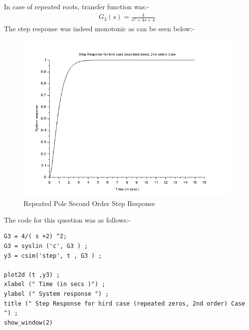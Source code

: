 \documentclass[12pt]{article}
\begin{document}
    In case of repeated roots, transfer function was:-
    \begin{align*}
        G_3(s) = \frac{4}{s^2+4s+4}
    \end{align*}
    The step response was indeed monotonic as can be seen below:-
    \begin{figure}[H]
        \centering
        \includegraphics[scale=0.8]{q3_2.png}
        \caption{Repeated Pole Second Order Step Response}
        \label{fig:my_label}
    \end{figure}

    The code for this question was as follows:-
    \begin{verbatim}
G3 = 4/( s +2) ^2;
G3 = syslin ('c', G3 ) ;
y3 = csim('step', t , G3 ) ;

plot2d (t ,y3) ;
xlabel (" Time (in secs )") ;
ylabel (" System response ") ;
title (" Step Response for hird case (repeated zeros, 2nd order) Case ") ;
show_window(2)
    \end{verbatim}
    
\end{document}
